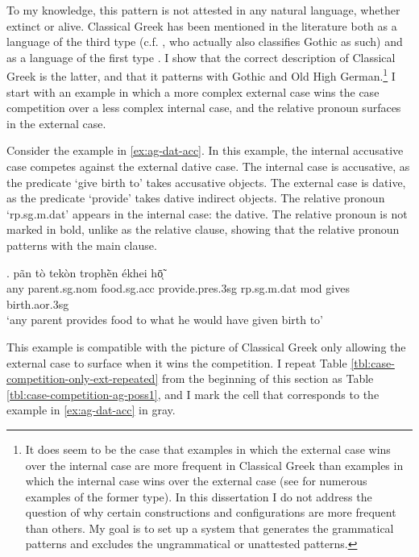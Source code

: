 To my knowledge, this pattern is not attested in any natural language, whether extinct or alive. Classical Greek has been mentioned in the literature both as a language of the third type (c.f. \citealt[120]{cinqueforthcoming}, who actually also classifies Gothic as such) and as a language of the first type \citep[cf.][41]{grosu1987}. I show that the correct description of Classical Greek is the latter, and that it patterns with Gothic and Old High German.\footnote{
It does seem to be the case that examples in which the external case wins over the internal case are more frequent in Classical Greek than examples in which the internal case wins over the external case (see \citealt{kakarikos2014} for numerous examples of the former type).
In this dissertation I do not address the question of why certain constructions and configurations are more frequent than others. My goal is to set up a system that generates the grammatical patterns and excludes the ungrammatical or unattested patterns.
}
I start with an example in which a more complex external case wins the case competition over a less complex internal case, and the relative pronoun surfaces in the external case.

Consider the example in \ref{ex:ag-dat-acc}. In this example, the internal accusative case competes against the external dative case.
The internal case is accusative, as the predicate  `give birth to' takes accusative objects.
The external case is dative, as the predicate  `provide' takes dative indirect objects.
The relative pronoun  `\ac{rp}.\ac{sg}.\ac{m}.\ac{dat}' appears in the internal case: the dative. The relative pronoun is not marked in bold, unlike as the relative clause, showing that the relative pronoun patterns with the main clause.

\exg. pãn {tò tekòn} trophḕn ékhei hō̃ͅ  \\
any parent.\ac{sg}.\ac{nom} food.\ac{sg}.\ac{acc} provide.\ac{pres}.3\ac{sg}\scsub{[dat]} \ac{rp}.\ac{sg}.\ac{m}.\ac{dat} \ac{mod} {gives birth}.\ac{aor}.3\ac{sg}\scsub{[acc]}\\
`any parent provides food to what he would have given birth to' \label{ex:ag-dat-acc}

This example is compatible with the picture of Classical Greek only allowing the external case to surface when it wins the competition. I repeat Table \ref{tbl:case-competition-only-ext-repeated} from the beginning of this section as Table \ref{tbl:case-competition-ag-poss1}, and I mark the cell that corresponds to the example in \ref{ex:ag-dat-acc} in gray.

